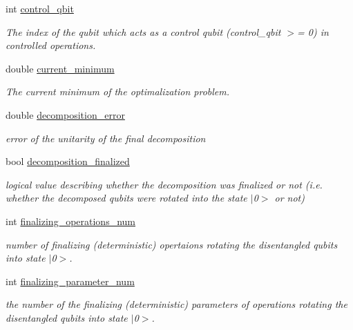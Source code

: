 \begin{DoxyCompactItemize}
\item 
int \hyperlink{class_operation_a9a798ea8adec5a45fd2ca07996da88e1}{control\+\_\+qbit}
\begin{DoxyCompactList}\small\item\em The index of the qubit which acts as a control qubit (control\+\_\+qbit $>$= 0) in controlled operations. \end{DoxyCompactList}\item 
double \hyperlink{class_decomposition___base_a7a8a6050c20f7965286792493a55d877}{current\+\_\+minimum}
\begin{DoxyCompactList}\small\item\em The current minimum of the optimalization problem. \end{DoxyCompactList}\item 
double \hyperlink{class_decomposition___base_a9b181a78ecfd103c9b233ddafa2defdd}{decomposition\+\_\+error}
\begin{DoxyCompactList}\small\item\em error of the unitarity of the final decomposition \end{DoxyCompactList}\item 
bool \hyperlink{class_decomposition___base_a488bfdaecfefa4fb9fb3149657b40b6d}{decomposition\+\_\+finalized}
\begin{DoxyCompactList}\small\item\em logical value describing whether the decomposition was finalized or not (i.\+e. whether the decomposed qubits were rotated into the state $\vert$0$>$ or not) \end{DoxyCompactList}\item 
int \hyperlink{class_decomposition___base_a0685291401fc40fee1121eddba63a429}{finalizing\+\_\+operations\+\_\+num}
\begin{DoxyCompactList}\small\item\em number of finalizing (deterministic) opertaions rotating the disentangled qubits into state $\vert$0$>$. \end{DoxyCompactList}\item 
int \hyperlink{class_decomposition___base_ae83ca982ee7da29119245860d212864c}{finalizing\+\_\+parameter\+\_\+num}
\begin{DoxyCompactList}\small\item\em the number of the finalizing (deterministic) parameters of operations rotating the disentangled qubits into state $\vert$0$>$. \end{DoxyCompactList}\item 

\end{DoxyCompactItemize}
